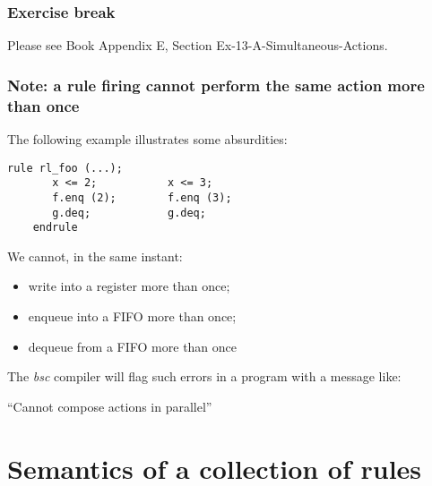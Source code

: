 
\begin{frame}
\frametitle{\EmojiExercise \hmm Exercise break}

Please see Book Appendix E, Section Ex-13-A-Simultaneous-Actions.

\end{frame}


\begin{frame}[fragile]
\frametitle{Note: a rule firing cannot perform the same action more than once}

\footnotesize

The following example illustrates some absurdities:

\vspace{2ex}

\begin{minipage}{0.5\textwidth}
\begin{Verbatim}[frame=single]
    rule rl_foo (...);
       x <= 2;           x <= 3;
       f.enq (2);        f.enq (3);
       g.deq;            g.deq;
    endrule
\end{Verbatim}
\end{minipage}
\hm
\begin{minipage}{0.45\textwidth}
We cannot, in the same instant:
\begin{itemize}
 \item write into a register more than once;
 \item enqueue into a FIFO more than once;
 \item dequeue from a FIFO more than once
\end{itemize}
\end{minipage}

\vspace{5ex}

The \emph{bsc} compiler will flag such errors in a program with a
message like:

\vspace{1ex}

\hmmm ``Cannot compose actions in parallel''

\end{frame}


\section{Semantics of a collection of rules}

